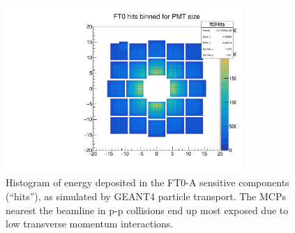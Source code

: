 \begin{figure}[H]
    \centering
    \includegraphics[width= 0.8\textwidth]{figures/analysis/T0+_Sensitive_Components.pdf}
    \caption{Histogram of energy deposited in the FT0-A sensitive components (``hits''), as simulated by GEANT4 particle transport. The MCPs nearest the beamline in p-p collisions end up most exposed due to low transverse momentum interactions.}
    \label{fig:HitHistogram}
\end{figure}
